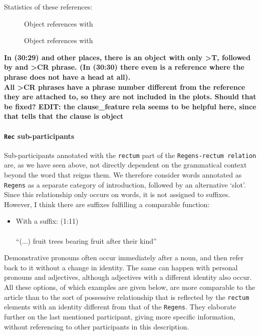 \documentclass{report}
\newcommand{\mi}[1]{\lstinline{#1}}
\newcommand{\cl}[2]{\begingroup\beginL\begingroup\color{#1}\beginR#2\endR\endgroup\endL\endgroup}
\newcommand{\hebr}[1]{\cjRL{#1}}
\begin{document}
Statistics of these references:
\begin{figure}

\caption{Object references with \hebr{>T}}
\end{figure}
\begin{figure}

\caption{Object references with \hebr{>T}}
\end{figure}

\textbf{In (30:29) and other places, there is an object with only >T, followed by and >CR phrase. (In (30:30) there even is a reference where the \hebr{>CR} phrase does not have a head at all).}\\
\textbf{All >CR phrases have a phrase number different from the reference they are attached to, so they are not included in the plots. Should that be fixed? EDIT: the clause\_feature rela seems to be helpful here, since that tells that the clause is object}

\paragraph{\mi{Rec} sub-participants}
Sub-participants annotated with the \mi{rectum} part of the \mi{Regens-rectum relation} are, as we have seen above, not directly dependent on the grammatical context beyond the word that reigns them. We therefore consider words annotated as \mi{Regens} as a separate category of introduction, followed by an alternative `slot'. Since this relationship only occurs on words, it is not assigned to suffixes. However, I think there are suffixes fulfilling a comparable function:

\begin{itemize}
\item With a suffix: (1:11) \\ \hebr{<Y PRJ <FH PRJ L MJN\cl{red}{W}} \\ ``(...) fruit trees bearing fruit after their kind''
\end{itemize}

Demonstrative pronouns often occur immediately after a noun, and then refer back to it without a change in identity. The same can happen with personal pronouns and adjectives, although adjectives with a different identity also occur. All these options, of which examples are given below, are more comparable to the article than to the sort of possessive relationship that is reflected by the \mi{rectum} elements with an identity different from that of the \mi{Regens}. They elaborate further on the last mentioned participant, giving more specific information, without referencing to other participants in this description.
\end{document}
